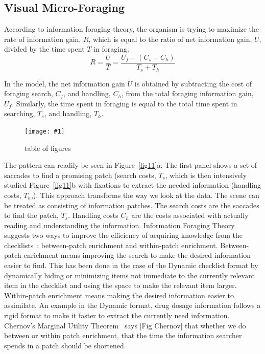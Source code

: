 \documentclass{sigchi}
\newcommand{\insertpicture}[2]{\begin{center}\texttt{[image: \#1]}\end{center}}
\begin{document}
\subsection{Visual Micro-Foraging} 

According to information foraging theory, the organism is trying to 
maximize the rate of information gain, $R$, which is equal to 
the ratio of net information gain, $U$,  divided by the time spent $T$ in 
foraging.
\[
R  =  \frac{U}
{
T
}
 =  \frac{U_f - \left(C_s + C_h\right)}
{
	T_s + T_h 
	} 
\]

 In the model, the net information gain $U$  is obtained  by    
 subtracting the cost of foraging search, $C_f$,  and handling, $C_h$,  from  
 the total foraging information gain, $U_f$. Similarly, the time spent in 
 foraging is equal to the total time spent  in searching, $T_s$,  and 
 handling, $T_h$. 


\begin{figure}
	\insertpicture{figures/dummy.eps}{0.8}
	\caption{table of figures \label{fig10}}
\end{figure}

The pattern can readily be seen in Figure~\ref{fig11}a. The first panel 
shows a set of saccades to find a promising patch (search costs,  $T_s$, which is then intensively studied 
Figure~\ref{fig11}b with fixations to extract the 
needed information (handling costs, $T_h$,).  This approach transforms the way we 
look at the data. The scene can be treated as consisting of information patches. The search
costs are the saccades to find the patch, $T_s$. Handling costs $C_h$ are the costs
associated with actually reading and understanding the information.
Information Foraging Theory suggests two ways to improve the efficiency of
acquiring knowledge from the checklists~\cite{Pirolli_1999}: between-patch enrichment
and within-patch enrichment. Between-patch enrichment means improving the
search to make the desired information easier to find. This has been done
in the case of the Dynamic checklist format by dynamically hiding or
minimizing items not immediate to the currently relevant item in the
checklist and using the space to make the relevant item larger.
Within-patch enrichment means making the desired information easier to
assimilate. An example in the Dynamic format, drug dosage information
follows a rigid format to make it faster to extract the currently need
information. Chernov’s Marginal Utility Theorem~\cite{Stephens_1986)} says 
[Fig Chernov] that whether we do between or within patch enrichment, that the 
time the information searcher spends in a patch should be shortened. 
\end{document}
